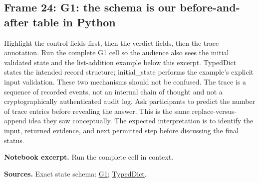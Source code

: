 \documentclass[11pt]{article}
\begin{document}
\subsection*{Frame 24: G1: the schema is our before-and-after table in Python}
Highlight the control fields first, then the verdict fields, then the trace annotation. Run the complete G1 cell so the audience also sees the initial validated state and the list-addition example below this excerpt. TypedDict states the intended record structure; initial\_state performs the example's explicit input validation. These two mechanisms should not be confused. The trace is a sequence of recorded events, not an internal chain of thought and not a cryptographically authenticated audit log. Ask participants to predict the number of trace entries before revealing the answer. This is the same replace-versus-append idea they saw conceptually. The expected interpretation is to identify the input, returned evidence, and next permitted step before discussing the final status.\par
\par\noindent\begin{minipage}{\linewidth}\textbf{Notebook excerpt.} Run the complete cell in context.\par \end{minipage}\par
\par\nopagebreak\begin{minipage}{\linewidth}{\footnotesize\color{slate}\textbf{Sources.} Exact state schema: \href{../Graph_Workflow_Lab.ipynb}{G1}; \href{https://docs.python.org/3/library/typing.html}{TypedDict}.\par}\end{minipage}\par\medskip
\end{document}
